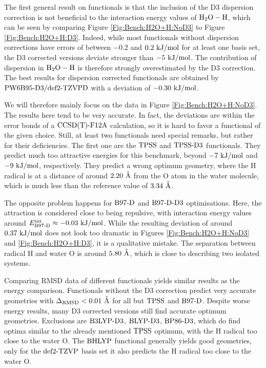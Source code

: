 \documentclass[8.5pt,twoside,twocolumn]{article}
\newcommand\eint{\enmat{E^{\te{int}}}}
\renewcommand{\Ang}{\mathring{\te{A}}}
\newcommand\kmo{\enmat{\te {kJ/mol}}}
\theoremstyle{standard}
\begin{document}
The first general result on functionals is that the inclusion
of the D3 dispersion correction is not beneficial to the interaction
energy values of $\mbox{\ensuremath{\text H _2 \text O-\text H}}$, which can be seen by comparing Figure \ref{Fig:Bench:H2O+H:NoD3}
to Figure \ref{Fig:Bench:H2O+H:D3}. Indeed, while most functionals without
dispersion corrections have errors of between $-0.2$ and $0.2\ \kmo$ for at
least one basis set, the D3 corrected versions deviate stronger than $-5\ \kmo$.
The contribution of dispersion in $\mbox{\ensuremath{\text H _2 \text O-\text H}}$ is therefore strongly overestimated by the
D3 correction. The best results for dispersion corrected functionals are obtained
by $\text{PW6B95}\text{-D3}/\text{def2-TZVPD}$ with a deviation of $-0.30\ \kmo$.

We will therefore mainly focus on the data in Figure \ref{Fig:Bench:H2O+H:NoD3}. 
The results here tend to be very accurate.
In fact, the deviations are within the error bonds of a $\text{CCSD(T)-F12A}$ calculation,
so it is hard to favor a functional of the given choice. Still, at least two
functionals need special remarks, but rather for their deficiencies. The first one
are the $\text{TPSS}$ and $\text{TPSS}\text{-D3}$ functionals. They predict much too attractive energies
for this benchmark, beyond $-7\ \kmo$ and $-9\ \kmo$, respectively. 
They predict
a wrong optimum geometry, where the H radical is at a distance of around $2.20\ \Ang$
from the O atom in the water molecule, which is much less than the reference
value of $3.34\ \Ang$.

The opposite problem happens for $\text{B97-D}$ and $\text{B97-D}\text{-D3}$ optimisations. Here, the attraction is
considered close to being repulsive, with interaction energy values around
\mbox{$\eint_{\bns}\approx -0.03\ \kmo$}. While the resulting deviation of around
$0.37\ \kmo$ does not look too dramatic in Figures \ref{Fig:Bench:H2O+H:NoD3} and
\ref{Fig:Bench:H2O+H:D3}, it is a qualitative mistake. The separation between
radical H and water O is around $5.80\ \Ang$, which is close to describing two isolated
systems.

Comparing RMSD data of different functionals yields similar results as the energy comparison.
Functionals without the D3 correction
predict very accurate geometries with $\DRMSD < 0.01\ \Ang$ for all but $\text{TPSS}$ and $\text{B97-D}$.
Despite worse energy results, many D3 corrected versions still find accurate optimum geometries.
Exclusions are $\text{B3LYP}\text{-D3}$, $\text{BLYP}\text{-D3}$, $\text{BP86}\text{-D3}$, which do find optima similar to the already mentioned
$\text{TPSS}$ optimum, with the H radical too close to the water O. The $\text{BHLYP}$ functional
generally yields good geometries, only for the $\text{def2-TZVP}$ basis set it also predicts the H
radical too close to the water O.
\end{document}
